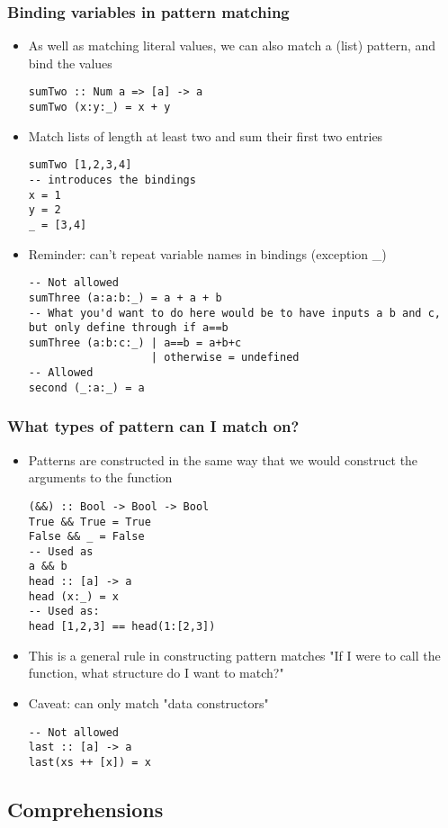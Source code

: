 \documentclass{article}[18pt]
\begin{document}
\subsubsection{Binding variables in pattern matching}
\begin{itemize}
	\item As well as matching literal values, we can also match a (list) pattern, and bind the values
\begin{verbatim}
sumTwo :: Num a => [a] -> a
sumTwo (x:y:_) = x + y
\end{verbatim}
	\item Match lists of length at least two and sum their first two entries
\begin{verbatim}
sumTwo [1,2,3,4]
-- introduces the bindings
x = 1
y = 2
_ = [3,4]
\end{verbatim}
\item Reminder: can't repeat variable names in bindings (exception \_)
\begin{verbatim}
-- Not allowed
sumThree (a:a:b:_) = a + a + b
-- What you'd want to do here would be to have inputs a b and c, but only define through if a==b
sumThree (a:b:c:_) | a==b = a+b+c
				   | otherwise = undefined
-- Allowed
second (_:a:_) = a
\end{verbatim}
\end{itemize}
\subsubsection{What types of pattern can I match on?}
\begin{itemize}
	\item Patterns are constructed in the same way that we would construct the arguments to the function
\begin{verbatim}
(&&) :: Bool -> Bool -> Bool
True && True = True
False && _ = False
-- Used as
a && b
head :: [a] -> a
head (x:_) = x
-- Used as:
head [1,2,3] == head(1:[2,3])
\end{verbatim}
	\item This is a general rule in constructing pattern matches "If I were to call the function, what structure do I want to match?"
	\item Caveat: can only match "data constructors"
\begin{verbatim}
-- Not allowed
last :: [a] -> a
last(xs ++ [x]) = x
\end{verbatim}
\end{itemize}
\subsection{Comprehensions}
\end{document}
